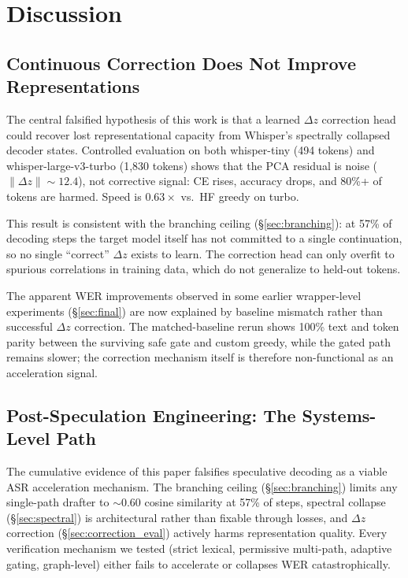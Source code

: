 \documentclass[11pt,a4paper]{article}
\begin{document}
\section{Discussion}

\subsection{Continuous Correction Does Not Improve Representations}

The central falsified hypothesis of this work is that a learned $\Delta z$ correction head could recover lost representational capacity from Whisper's spectrally collapsed decoder states.
Controlled evaluation on both whisper-tiny (494 tokens) and whisper-large-v3-turbo (1,830 tokens) shows that the PCA residual is noise ($\|\Delta z\| \sim 12.4$), not corrective signal: CE rises, accuracy drops, and 80\%+ of tokens are harmed.
Speed is $0.63\times$ vs.\ HF greedy on turbo.

This result is consistent with the branching ceiling (\S\ref{sec:branching}): at 57\% of decoding steps the target model itself has not committed to a single continuation, so no single ``correct'' $\Delta z$ exists to learn.
The correction head can only overfit to spurious correlations in training data, which do not generalize to held-out tokens.

The apparent WER improvements observed in some earlier wrapper-level experiments (\S\ref{sec:final}) are now explained by baseline mismatch rather than successful $\Delta z$ correction.
The matched-baseline rerun shows 100\% text and token parity between the surviving safe gate and custom greedy, while the gated path remains slower; the correction mechanism itself is therefore non-functional as an acceleration signal.

\subsection{Post-Speculation Engineering: The Systems-Level Path}

The cumulative evidence of this paper falsifies speculative decoding as a viable ASR acceleration mechanism. The branching ceiling (\S\ref{sec:branching}) limits any single-path drafter to ${\sim}0.60$ cosine similarity at 57\% of steps, spectral collapse (\S\ref{sec:spectral}) is architectural rather than fixable through losses, and $\Delta z$ correction (\S\ref{sec:correction_eval}) actively harms representation quality. Every verification mechanism we tested (strict lexical, permissive multi-path, adaptive gating, graph-level) either fails to accelerate or collapses WER catastrophically.
\end{document}
